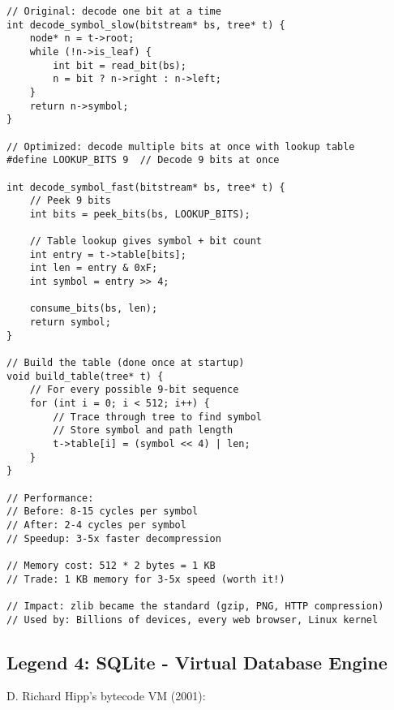 \begin{lstlisting}
// Original: decode one bit at a time
int decode_symbol_slow(bitstream* bs, tree* t) {
    node* n = t->root;
    while (!n->is_leaf) {
        int bit = read_bit(bs);
        n = bit ? n->right : n->left;
    }
    return n->symbol;
}

// Optimized: decode multiple bits at once with lookup table
#define LOOKUP_BITS 9  // Decode 9 bits at once

int decode_symbol_fast(bitstream* bs, tree* t) {
    // Peek 9 bits
    int bits = peek_bits(bs, LOOKUP_BITS);

    // Table lookup gives symbol + bit count
    int entry = t->table[bits];
    int len = entry & 0xF;
    int symbol = entry >> 4;

    consume_bits(bs, len);
    return symbol;
}

// Build the table (done once at startup)
void build_table(tree* t) {
    // For every possible 9-bit sequence
    for (int i = 0; i < 512; i++) {
        // Trace through tree to find symbol
        // Store symbol and path length
        t->table[i] = (symbol << 4) | len;
    }
}

// Performance:
// Before: 8-15 cycles per symbol
// After: 2-4 cycles per symbol
// Speedup: 3-5x faster decompression

// Memory cost: 512 * 2 bytes = 1 KB
// Trade: 1 KB memory for 3-5x speed (worth it!)

// Impact: zlib became the standard (gzip, PNG, HTTP compression)
// Used by: Billions of devices, every web browser, Linux kernel
\end{lstlisting}

\subsection{Legend 4: SQLite - Virtual Database Engine}

D. Richard Hipp's bytecode VM (2001):

